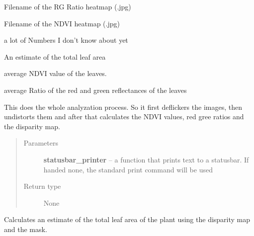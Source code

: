\documentclass[a4paper,10pt,openany,oneside]{sphinxmanual}
\begin{document}
\begin{fulllineitems}
\begin{DUlineblock}{0em}
\begin{DUlineblock}{\DUlineblockindent}
\item[]      Filename of the RG Ratio heatmap (.jpg)
\item[]    Filename of the NDVI heatmap (.jpg)
\item[]
\begin{DUlineblock}{\DUlineblockindent}
\item[] a lot of Numbers I don't know about yet
\end{DUlineblock}
\item[]         An estimate of the total leaf area
\item[]      average NDVI value of the leaves.
\item[]        average Ratio of the red and green reflectances of the leaves
\end{DUlineblock}
\end{DUlineblock}

\begin{fulllineitems}
\label{index:scripts.measurement.measurement.analyze}
This does the whole analyzation process. So it first deflickers the images,
then undistorts them and after that calculates the NDVI values, red gree ratios
and the disparity map.
\begin{quote}\begin{description}
\item[{Parameters}] \leavevmode
\textbf{statusbar\_printer} -- a function that prints text to a statusbar.
If handed none, the standard print command will be used

\item[{Return type}] \leavevmode
None

\end{description}\end{quote}

\end{fulllineitems}


\begin{fulllineitems}
\label{index:scripts.measurement.measurement.calculateNumbers}
Calculates an estimate of the total leaf area of the plant using the disparity map and
the mask.

\end{fulllineitems}


\end{fulllineitems}
\end{document}
